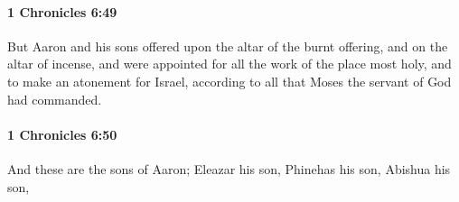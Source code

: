 		\paragraph{1 Chronicles 6:49} %
			\label{1CHRONICLES-6-49}

			But Aaron and his sons offered upon the altar of the burnt offering, and on the altar of incense, and were appointed for all the work of the place most holy, and to make an atonement for Israel, according to all that Moses the servant of God had commanded.


		\paragraph{1 Chronicles 6:50} %
			\label{1CHRONICLES-6-50}

			And these are the sons of Aaron; Eleazar his son, Phinehas his son, Abishua his son,


